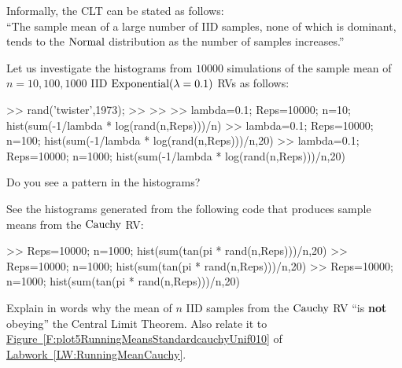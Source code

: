 Informally, the CLT can be stated as follows:\\
``The sample mean of a large number of IID samples, none of which is dominant, tends to the $\mbox{{\rm Normal}}$ distribution as the number of samples increases.''

\begin{labwork}[Investigating the Central Limit Theorem with IID $\exponential(\lambda=0.1)$ RVs]\label{LW:CLTOfExponentials}
Let us investigate the histograms from $10000$ simulations of the sample mean of $n=10,100,1000$ IID $\exponential(\lambda=0.1)$ RVs as follows:
\begin{VrbM}
>> rand('twister',1973); %
>> %
>> %
>> lambda=0.1; Reps=10000; n=10; hist(sum(-1/lambda * log(rand(n,Reps)))/n)
>> lambda=0.1; Reps=10000; n=100; hist(sum(-1/lambda * log(rand(n,Reps)))/n,20)
>> lambda=0.1; Reps=10000; n=1000; hist(sum(-1/lambda * log(rand(n,Reps)))/n,20)
\end{VrbM}
Do you see a pattern in the histograms?

See the histograms generated from the following code that produces sample means from the $\mbox{{\rm Cauchy}}$ RV:
\begin{VrbM}
>> Reps=10000; n=1000; hist(sum(tan(pi * rand(n,Reps)))/n,20)
>> Reps=10000; n=1000; hist(sum(tan(pi * rand(n,Reps)))/n,20)
>> Reps=10000; n=1000; hist(sum(tan(pi * rand(n,Reps)))/n,20)
\end{VrbM}
\end{labwork}
\begin{classwork}
Explain in words why the mean of $n$ IID samples from the $\mbox{{\rm Cauchy}}$ RV ``is {\bf not} obeying'' the Central Limit Theorem.  Also relate it to \hyperref[F:plot5RunningMeansStandardcauchyUnif010]{Figure~\ref*{F:plot5RunningMeansStandardcauchyUnif010}} of \hyperref[LW:RunningMeanCauchy]{Labwork~\ref*{LW:RunningMeanCauchy}}.
\end{classwork}

